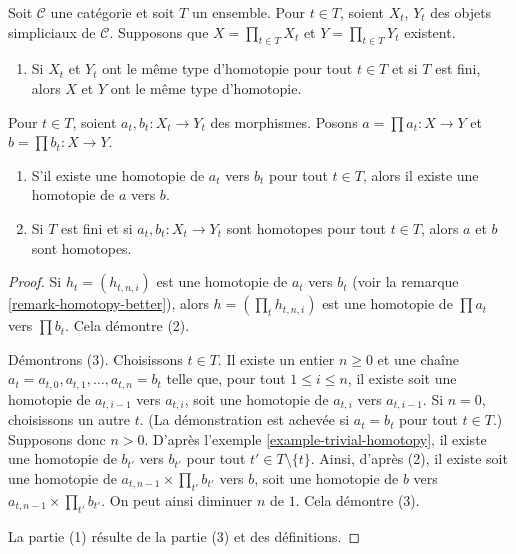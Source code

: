 \begin{lemma}
\label{lemma-products-homotopy}
Soit $\mathcal{C}$ une catégorie et soit $T$ un ensemble. Pour $t \in T$,
soient $X_t$, $Y_t$ des objets simpliciaux de $\mathcal{C}$. Supposons que
$X = \prod_{t \in T} X_t$ et $Y = \prod_{t \in T} Y_t$ existent.
\begin{enumerate}
\item Si $X_t$ et $Y_t$ ont le même type d'homotopie pour tout $t \in T$
et si $T$ est fini, alors $X$ et $Y$ ont le même type d'homotopie.
\end{enumerate}
Pour $t \in T$, soient $a_t, b_t : X_t \to Y_t$ des morphismes.
Posons $a = \prod a_t : X \to Y$ et $b = \prod b_t : X \to Y$.
\begin{enumerate}
\item[(2)] S'il existe une homotopie de $a_t$ vers $b_t$ pour
tout $t \in T$, alors il existe une homotopie de $a$ vers $b$.
\item[(3)] Si $T$ est fini et si $a_t, b_t : X_t \to Y_t$ sont homotopes
pour tout $t \in T$, alors $a$ et $b$ sont homotopes.
\end{enumerate}
\end{lemma}

\begin{proof}
Si $h_t = (h_{t, n , i})$ est une homotopie de $a_t$ vers $b_t$
(voir la remarque \ref{remark-homotopy-better}), alors
$h = (\prod_t h_{t, n, i})$ est une homotopie de $\prod a_t$ vers
$\prod b_t$. Cela démontre (2).

\medskip\noindent
Démontrons (3). Choisissons $t \in T$. Il existe un entier $n \geq 0$
et une chaîne $a_t = a_{t, 0}, a_{t, 1}, \ldots, a_{t, n} = b_t$ telle que,
pour tout $1 \leq i \leq n$, il existe soit une homotopie de
$a_{t, i - 1}$ vers $a_{t, i}$, soit une homotopie de
$a_{t, i}$ vers $a_{t, i - 1}$. Si $n = 0$, choisissons un autre $t$.
(La démonstration est achevée si $a_t = b_t$ pour tout $t \in T$.)
Supposons donc $n > 0$. D'après l'exemple \ref{example-trivial-homotopy},
il existe une homotopie de $b_{t'}$ vers $b_{t'}$ pour tout
$t' \in T \setminus \{t\}$. Ainsi, d'après (2), il existe soit une homotopie de
$a_{t, n - 1} \times \prod_{t'} b_{t'}$ vers $b$, soit une homotopie de
$b$ vers $a_{t, n - 1} \times \prod_{t'} b_{t'}$.
On peut ainsi diminuer $n$ de $1$. Cela démontre (3).

\medskip\noindent
La partie (1) résulte de la partie (3) et des définitions.
\end{proof}




